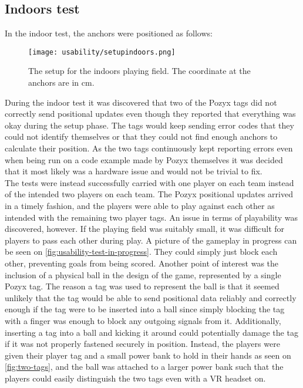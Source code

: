 \subsection{Indoors test}
In the indoor test, the anchors were positioned as follows:
\begin{figure}[H]
    \centering
    \texttt{[image: usability/setupindoors.png]}
    \caption{The setup for the indoors playing field. The coordinate at the anchors are in cm.}
    \label{fig:test2-indoor-setup}
\end{figure}
\noindent
During the indoor test it was discovered that two of the Pozyx tags did not correctly send positional updates even though they reported that everything was okay during the setup phase.
The tags would keep sending error codes that they could not identify themselves or that they could not find enough anchors to calculate their position.
As the two tags continuously kept reporting errors even when being run on a code example made by Pozyx themselves it was decided that it most likely was a hardware issue and would not be trivial to fix.
\\
The tests were instead successfully carried with one player on each team instead of the intended two players on each team.
The Pozyx positional updates arrived in a timely fashion, and the players were able to play against each other as intended with the remaining two player tags.
An issue in terms of playability was discovered, however.
If the playing field was suitably small, it was difficult for players to pass each other during play.
A picture of the gameplay in progress can be seen on \autoref{fig:usability-test-in-progress}.
They could simply just block each other, preventing goals from being scored.
Another point of interest was the inclusion of a physical ball in the design of the game, represented by a single Pozyx tag.
The reason a tag was used to represent the ball is that it seemed unlikely that the tag would be able to send positional data reliably and correctly enough if the tag were to be inserted into a ball since simply blocking the tag with a finger was enough to block any outgoing signals from it.
Additionally, inserting a tag into a ball and kicking it around could potentially damage the tag if it was not properly fastened securely in position.
Instead, the players were given their player tag and a small power bank to hold in their hands as seen on \autoref{fig:two-tags}, and the ball was attached to a larger power bank such that the players could easily distinguish the two tags even with a VR headset on.

